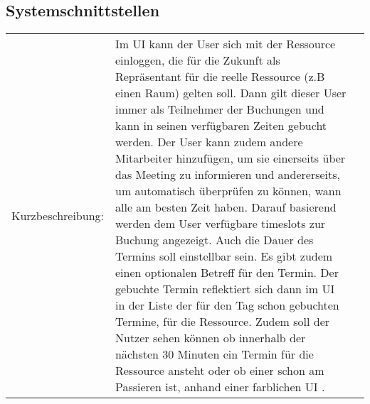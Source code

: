 
\subsection{Systemschnittstellen}\label{subsec:systemschnittstellen}
\begin{tabularx}{\textwidth\footnotesize}{|l*{2}{|X}|} \hline
    \caption{Termin buchen}
    \label{tab:TerminBuchen}
 Kurzbeschreibung: & Im UI kann der User sich mit der Ressource einloggen, die für die Zukunft als Repräsentant für die reelle Ressource (z.B einen Raum) gelten soll.
    Dann gilt dieser User immer als Teilnehmer der Buchungen und kann in seinen verfügbaren Zeiten gebucht werden.
    Der User kann zudem andere Mitarbeiter hinzufügen, um sie einerseits über das Meeting zu informieren und andererseits, um automatisch überprüfen zu können, wann alle am besten Zeit haben.
    Darauf basierend werden dem User verfügbare timeslots zur Buchung angezeigt.
    Auch die Dauer des Termins soll einstellbar sein.
    Es gibt zudem einen optionalen Betreff für den Termin.
    Der gebuchte Termin reflektiert sich dann im UI in der Liste der für den Tag schon gebuchten Termine, für die Ressource.
    Zudem soll der Nutzer sehen können ob innerhalb der nächsten 30 Minuten ein Termin für die Ressource ansteht oder ob einer schon am Passieren ist, anhand einer farblichen UI .


\end{tabularx}
